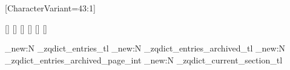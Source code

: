 \usepackage{hyperref}

\usepackage[disablejfam]{luatexja}
\usepackage{luatexja-fontspec}
\usepackage{luatexja-ruby}

\usepackage{expl3}
\usepackage{adjustbox}
\usepackage{calc}
\usepackage{fancyhdr}
\usepackage{ifthen}
\usepackage{multicol}
\usepackage{pdfcomment}
\usepackage{pxpic}
\usepackage{enumitem}
\usepackage{titlesec}
\usepackage{xparse}

\usepackage{geometry}

\setmainfont{Junicode}
\setfontface{}[CharacterVariant={43:1}]
\setfontface{}





\newjfontfamily{}[]
\newjfontfamily{}[]
\newjfontfamily{}[]
\newjfontfamily{}[]
\newjfontfamily{}[]
\newjfontfamily{}[]

\newcommand{\textJapn}[1]{{%
    \fontMainJapn%
    #1%
  }}
\newcommand{\textKor}[1]{{%
    \fontMainKo
    #1%
  }}
\newcommand{\textHant}[1]{{%
    \fontMainHans%
    #1%
  }}
\newcommand{\textHans}[1]{{%
    \fontMainHans%
    #1%
  }}


\newlength{\EntryDescriptionLineLength}
\newlength{\EntryDescriptionLineHeight}
\newlength{\EntryDescriptionLineIndent}

\providecommand\phantomsection{}

\geometry{top=10mm,headheight=18pt,headsep=2pt,inner=20mm,outer=10mm,textheight=55em}

\ExplSyntaxOn

\tl_new:N \g_zqdict_entries_tl
\tl_new:N \g_zqdict_entries_archived_tl
\int_new:N \g_zqdict_entries_archived_page_int
\tl_new:N \g_zqdict_current_section_tl

